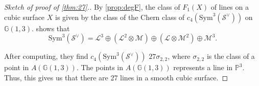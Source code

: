 \begin{proof}[Sketch of proof of \cref{thm:27}.]

    By \cref{prop:degF}, the class of $F_1(X)$ of lines on a cubic surface $X$ is given by the class of the Chern class of $c_4(\mathrm{Sym}^3(\mathcal{S}^\vee))$ on $\mathbb{G}(1,3)$. \cite{EH16} shows that 
    \[\mathrm{Sym}^3(\mathcal{S}^\vee) = \mathcal{L}^3 \oplus (\mathcal{L}^2 \otimes \mathcal{M}) \oplus (\mathcal{L} \otimes \mathcal{M}^2) \oplus \mathcal{M}^3.\]
    
    After computing, they find $c_4(\mathrm{Sym}^3(\mathcal{S}^\vee))$ $27\sigma_{2,2}$, where $\sigma_{2,2}$ is the class of a point in $A(\mathbb{G}(1,3))$. The points in $A(\mathbb{G}(1,3))$ represents a line in $\mathbb{P}^3$. Thus, this gives us that there are 27 lines in a smooth cubic surface.





\end{proof}
